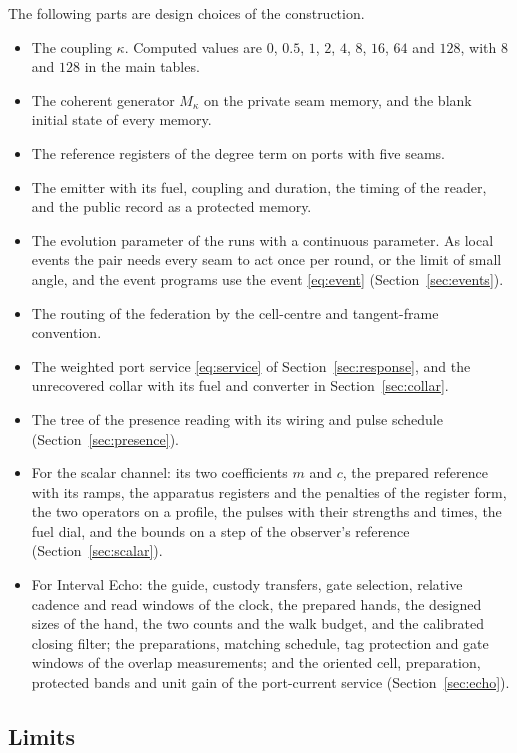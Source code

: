 \documentclass[11pt]{article}
\theoremstyle{definition}
\theoremstyle{remark}
\theoremstyle{plain}
\begin{document}
The following parts are design choices of the construction.
\begin{itemize}[leftmargin=1.6em,itemsep=1pt]
\item The coupling $\kappa$. Computed values are $0$, $0.5$, $1$, $2$, $4$,
$8$, $16$, $64$ and $128$, with $8$ and $128$ in the main tables.
\item The coherent generator $M_\kappa$ on the private seam memory, and the
blank initial state of every memory.
\item The reference registers of the degree term on ports with five seams.
\item The emitter with its fuel, coupling and duration, the timing of the
reader, and the public record as a protected memory.
\item The evolution parameter of the runs with a continuous parameter. As
local events the pair needs every seam to act once per round, or the limit
of small angle, and the event programs use the event \eqref{eq:event}
(Section~\ref{sec:events}).
\item The routing of the federation by the cell-centre and tangent-frame
convention.
\item The weighted port service \eqref{eq:service} of
Section~\ref{sec:response}, and the unrecovered collar with its fuel and
converter in Section~\ref{sec:collar}.
\item The tree of the presence reading with its wiring and pulse schedule
(Section~\ref{sec:presence}).
\item For the scalar channel: its two coefficients $m$ and $c$, the
prepared reference with its ramps, the apparatus registers and the
penalties of the register form, the two operators on a profile, the pulses
with their strengths and times, the fuel dial, and the bounds on a step of
the observer's reference (Section~\ref{sec:scalar}).
\item For Interval Echo: the guide, custody transfers, gate selection,
relative cadence and read windows of the clock, the prepared hands, the
designed sizes of the hand, the two counts and the walk budget, and the
calibrated closing filter; the preparations, matching schedule, tag
protection and gate windows of the overlap measurements; and the oriented
cell, preparation, protected bands and unit gain of the port-current
service (Section~\ref{sec:echo}).
\end{itemize}

\subsection{Limits}
\end{document}
